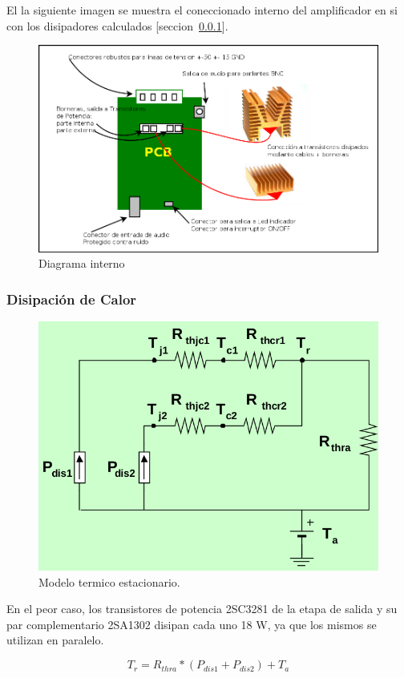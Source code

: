 \documentclass[a4paper,12pt,twoside]{article}
\begin{document}
El la siguiente imagen se muestra el coneccionado interno del amplificador en si con los disipadores calculados [seccion~\ref{sec:disipadores}].

\begin{figure}[H]
\centering
\includegraphics[width=1\textwidth]{img/integracion/diagrama_interno}
\caption{Diagrama interno}
\label{fig:circuito} 
\end{figure}




\subsubsection{Disipación de Calor}
\label{sec:disipadores}
\begin{figure}[H]
    \centering
    \includegraphics[height=0.4\textwidth]{img/calculo_disipador}
    \caption{Modelo termico estacionario.}
    \label{fig:disipadores}
\end{figure}

En el peor caso, los transistores de potencia 2SC3281 de la etapa de salida y su par complementario 2SA1302
disipan cada uno 18 W, ya que los mismos se utilizan en paralelo.

\begin{equation*}
T_r = R_{thra} * (P_{dis1}+P_{dis2}) + T_a
\end{equation*}
\end{document}
